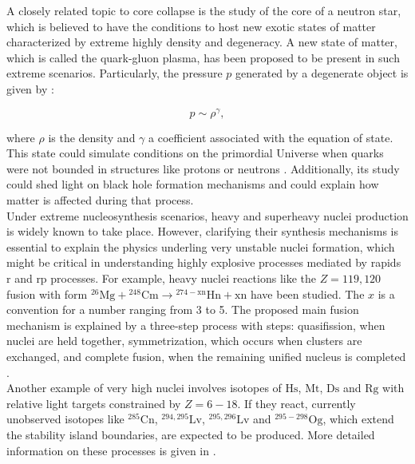 \documentclass[openany]{book}
\begin{document}
A closely related topic to core collapse is the study of the core of a neutron star, which is believed to have the conditions to host new exotic states of matter characterized by extreme highly density and degeneracy. A new state of matter, which is called the quark-gluon plasma, has been proposed to be present in such extreme scenarios. Particularly, the pressure $p$ generated  by a degenerate object is given by \cite{kundt_2005}: 

\begin{equation}\label{eq:reaction_degenerate}
	p \sim \rho^{\gamma},
\end{equation} 

where $\rho$ is the density and $\gamma$ a coefficient associated with the equation of state. This state could simulate conditions on the primordial Universe when quarks were not bounded in structures like protons or neutrons \cite{bertulani_kajino_2016}. Additionally, its study could shed light on black hole formation mechanisms and could explain how matter is affected during that process. \\

Under extreme nucleosynthesis scenarios, heavy and superheavy nuclei production is widely known to take place. However, clarifying their synthesis mechanisms is essential to explain the physics underling very unstable nuclei formation, which might be critical in understanding highly explosive processes mediated by rapids r and rp processes. For example, heavy nuclei reactions like the $Z = 119, 120$ fusion with form $\mathrm{{}^{26}Mg + {}^{248}Cm \rightarrow {}^{274-xn}Hn +xn}$ have been studied. The $x$ is a convention for a number ranging from 3 to 5. The proposed main fusion mechanism is explained by a three-step process with steps: quasifission, when nuclei are held together, symmetrization, which occurs when clusters are exchanged, and complete fusion, when the remaining unified nucleus is completed \cite{adamian_antonenko_2022}. \\

Another example of very high nuclei involves isotopes of $\mathrm{Hs}$, $\mathrm{Mt}$, $\mathrm{Ds}$ and $\mathrm{Rg}$ with relative light targets constrained by $Z = 6-18$. If they react, currently unobserved isotopes like $\mathrm{{}^{285}Cn}$, $\mathrm{{}^{294, 295}Lv}$, $\mathrm{{}^{295, 296}Lv}$ and $\mathrm{{}^{295-298}Og}$, which extend the stability island boundaries, are expected to be produced. More detailed information on these processes is given in \cite{adamian_antonenko_2022}.  \\
\end{document}

